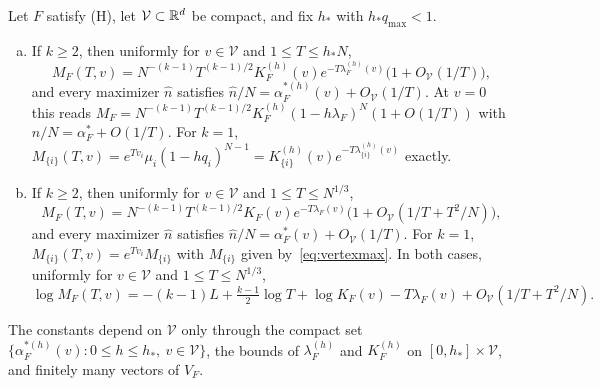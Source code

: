 \begin{theorem}\label{thm:facemax}
Let $F$ satisfy \textup{(H)}, let $\mathcal V\subset\mathbb{R}^d$ be compact, and fix $h_*$ with
$h_*q_{\max}<1$.
\begin{enumerate}[(a)]
\item If $k\ge2$, then uniformly for $v\in\mathcal V$ and $1\le T\le h_*N$,
\[
M_F(T,v)=N^{-(k-1)}T^{(k-1)/2}K^{(h)}_F(v)e^{-T\lambda^{(h)}_F(v)}\bigl(1+O_{\mathcal V}(1/T)\bigr),
\]
and every maximizer $\hat n$ satisfies $\hat n/N=\alpha^{*(h)}_F(v)+O_{\mathcal V}(1/T)$.
At $v=0$ this reads
$M_F=N^{-(k-1)}T^{(k-1)/2}K^{(h)}_F(1-h\lambda_F)^N(1+O(1/T))$ with
$\hat n/N=\alpha^*_F+O(1/T)$. For $k=1$,
$M_{\{i\}}(T,v)=e^{Tv_i}\mu_i(1-hq_i)^{N-1}=K^{(h)}_{\{i\}}(v)e^{-T\lambda^{(h)}_{\{i\}}(v)}$
exactly.
\item If $k\ge2$, then uniformly for $v\in\mathcal V$ and $1\le T\le N^{1/3}$,
\[
M_F(T,v)=N^{-(k-1)}T^{(k-1)/2}K_F(v)e^{-T\lambda_F(v)}\bigl(1+O_{\mathcal V}(1/T+T^2/N)\bigr),
\]
and every maximizer $\hat n$ satisfies $\hat n/N=\alpha^*_F(v)+O_{\mathcal V}(1/T)$. For
$k=1$, $M_{\{i\}}(T,v)=e^{Tv_i}M_{\{i\}}$ with $M_{\{i\}}$ given by~\eqref{eq:vertexmax}.
In both cases, uniformly for $v\in\mathcal V$ and $1\le T\le N^{1/3}$,
\begin{equation}\label{eq:logmax}
\log M_F(T,v)=-(k-1)L+\tfrac{k-1}2\log T+\log K_F(v)-T\lambda_F(v)+O_{\mathcal V}(1/T+T^2/N).
\end{equation}
\end{enumerate}
\end{theorem}

The constants depend on $\mathcal V$ only through the compact set
$\{\alpha^{*(h)}_F(v):0\le h\le h_*,\ v\in\mathcal V\}$, the bounds of
$\lambda^{(h)}_F$ and $K^{(h)}_F$ on $[0,h_*]\times\mathcal V$, and finitely many
vectors of $V_F$.

